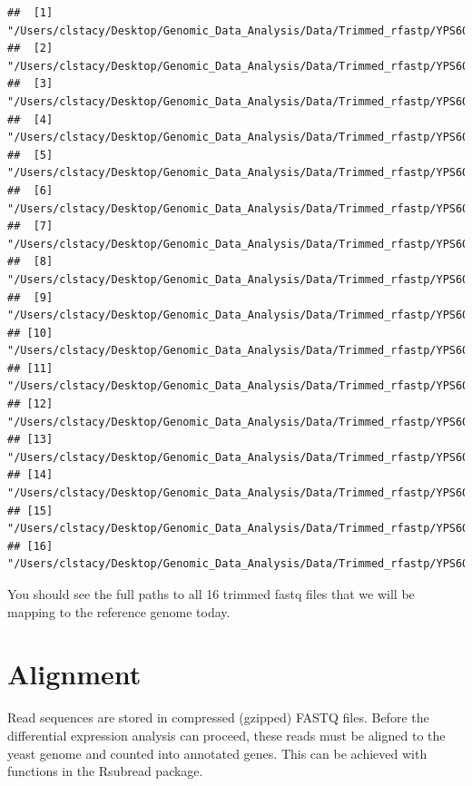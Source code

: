\documentclass[
]{book}
\begin{document}
\begin{verbatim}
##  [1] "/Users/clstacy/Desktop/Genomic_Data_Analysis/Data/Trimmed_rfastp/YPS606_MSN24_ETOH_REP1_R1.fastq.gz"
##  [2] "/Users/clstacy/Desktop/Genomic_Data_Analysis/Data/Trimmed_rfastp/YPS606_MSN24_ETOH_REP2_R1.fastq.gz"
##  [3] "/Users/clstacy/Desktop/Genomic_Data_Analysis/Data/Trimmed_rfastp/YPS606_MSN24_ETOH_REP3_R1.fastq.gz"
##  [4] "/Users/clstacy/Desktop/Genomic_Data_Analysis/Data/Trimmed_rfastp/YPS606_MSN24_ETOH_REP4_R1.fastq.gz"
##  [5] "/Users/clstacy/Desktop/Genomic_Data_Analysis/Data/Trimmed_rfastp/YPS606_MSN24_MOCK_REP1_R1.fastq.gz"
##  [6] "/Users/clstacy/Desktop/Genomic_Data_Analysis/Data/Trimmed_rfastp/YPS606_MSN24_MOCK_REP2_R1.fastq.gz"
##  [7] "/Users/clstacy/Desktop/Genomic_Data_Analysis/Data/Trimmed_rfastp/YPS606_MSN24_MOCK_REP3_R1.fastq.gz"
##  [8] "/Users/clstacy/Desktop/Genomic_Data_Analysis/Data/Trimmed_rfastp/YPS606_MSN24_MOCK_REP4_R1.fastq.gz"
##  [9] "/Users/clstacy/Desktop/Genomic_Data_Analysis/Data/Trimmed_rfastp/YPS606_WT_ETOH_REP1_R1.fastq.gz"   
## [10] "/Users/clstacy/Desktop/Genomic_Data_Analysis/Data/Trimmed_rfastp/YPS606_WT_ETOH_REP2_R1.fastq.gz"   
## [11] "/Users/clstacy/Desktop/Genomic_Data_Analysis/Data/Trimmed_rfastp/YPS606_WT_ETOH_REP3_R1.fastq.gz"   
## [12] "/Users/clstacy/Desktop/Genomic_Data_Analysis/Data/Trimmed_rfastp/YPS606_WT_ETOH_REP4_R1.fastq.gz"   
## [13] "/Users/clstacy/Desktop/Genomic_Data_Analysis/Data/Trimmed_rfastp/YPS606_WT_MOCK_REP1_R1.fastq.gz"   
## [14] "/Users/clstacy/Desktop/Genomic_Data_Analysis/Data/Trimmed_rfastp/YPS606_WT_MOCK_REP2_R1.fastq.gz"   
## [15] "/Users/clstacy/Desktop/Genomic_Data_Analysis/Data/Trimmed_rfastp/YPS606_WT_MOCK_REP3_R1.fastq.gz"   
## [16] "/Users/clstacy/Desktop/Genomic_Data_Analysis/Data/Trimmed_rfastp/YPS606_WT_MOCK_REP4_R1.fastq.gz"
\end{verbatim}

You should see the full paths to all 16 trimmed fastq files that we will be mapping to the reference genome today.

\hypertarget{alignment}{%
\section{Alignment}\label{alignment}}

Read sequences are stored in compressed (gzipped) FASTQ files. Before the differential expression analysis can proceed, these reads must be aligned to the yeast genome and counted into annotated genes. This can be achieved with functions in the Rsubread package.
\end{document}
